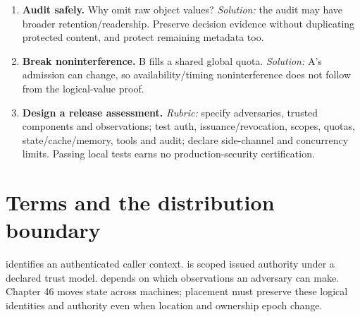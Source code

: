 \begin{enumerate}
a malicious completion? \emph{Solution:} a deterministic resource/action check
still gates execution; a behavioral instruction supplies no such guarantee.
\item \textbf{Audit safely.} Why omit raw object values? \emph{Solution:}
the audit may have broader retention/readership. Preserve decision evidence
without duplicating protected content, and protect remaining metadata too.
\item \textbf{Break noninterference.} B fills a shared global quota.
\emph{Solution:} A's admission can change, so availability/timing noninterference
does not follow from the logical-value proof.
\item \textbf{Design a release assessment.} \emph{Rubric:} specify adversaries,
trusted components and observations; test auth, issuance/revocation, scopes,
quotas, state/cache/memory, tools and audit; declare side-channel and concurrency
limits. Passing local tests earns no production-security certification.
\end{enumerate}

\section{Terms and the distribution boundary}
 identifies an authenticated caller context.
 is scoped issued authority under a declared trust model.
 depends on which observations an adversary can make.
Chapter 46 moves state across machines; placement must preserve these logical
identities and authority even when location and ownership epoch change.
